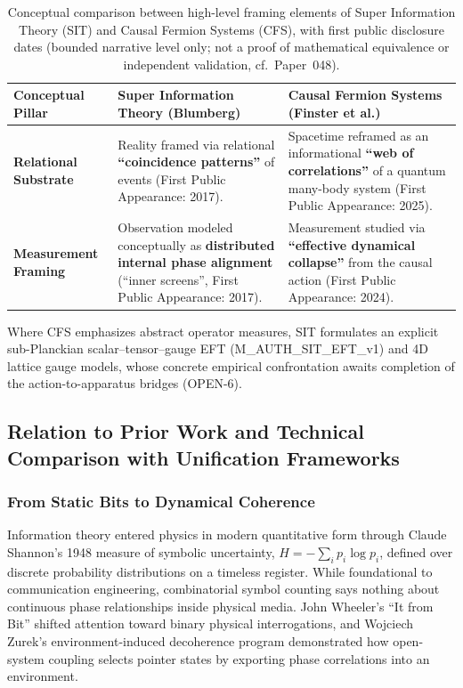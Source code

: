 \documentclass[american,11pt,letterpaper]{article}
\def\texttt#1{#1}%
\def\emph#1{#1}%
\begin{document}
\begin{table}[htbp]
\centering
\caption{Conceptual comparison between high-level framing elements of Super Information Theory (SIT) and Causal Fermion Systems (CFS), with first public disclosure dates (bounded narrative level only; not a proof of mathematical equivalence or independent validation, cf.\ Paper~048).}
\label{tab:sot-cfs-map}
\vspace{0.4em}
\begin{tabular}{|p{3.0cm}|p{5.8cm}|p{5.8cm}|}
\hline
\textbf{Conceptual Pillar} & \textbf{Super Information Theory (Blumberg)} & \textbf{Causal Fermion Systems (Finster et al.)} \\
\hline
\textbf{Relational Substrate} & Reality framed via relational \textbf{``coincidence patterns''} of events (\emph{First Public Appearance: 2017}). & Spacetime reframed as an informational \textbf{``web of correlations''} of a quantum many-body system (\emph{First Public Appearance: 2025}). \\
\hline
\textbf{Measurement Framing} & Observation modeled conceptually as \textbf{distributed internal phase alignment} (``inner screens'', \emph{First Public Appearance: 2017}). & Measurement studied via \textbf{``effective dynamical collapse''} from the causal action (\emph{First Public Appearance: 2024}). \\
\hline
\end{tabular}
\end{table}

Where CFS emphasizes abstract operator measures, SIT formulates an explicit sub-Planckian scalar--tensor--gauge EFT (\texttt{M\_AUTH\_SIT\_EFT\_v1}) and 4D lattice gauge models, whose concrete empirical confrontation awaits completion of the action-to-apparatus bridges (\texttt{OPEN-6}).

\subsection{Relation to Prior Work and Technical Comparison with Unification Frameworks}
\label{sec:relation-prior-work}
\label{sec:SITTechnicalComparison}

\subsubsection{From Static Bits to Dynamical Coherence}

Information theory entered physics in modern quantitative form through Claude Shannon's 1948 measure of symbolic uncertainty, $H = -\sum_i p_i \log p_i$, defined over discrete probability distributions on a timeless register. While foundational to communication engineering, combinatorial symbol counting says nothing about continuous phase relationships inside physical media. John Wheeler's \emph{``It from Bit''} shifted attention toward binary physical interrogations, and Wojciech Zurek's environment-induced decoherence program demonstrated how open-system coupling selects pointer states by exporting phase correlations into an environment.
\end{document}
